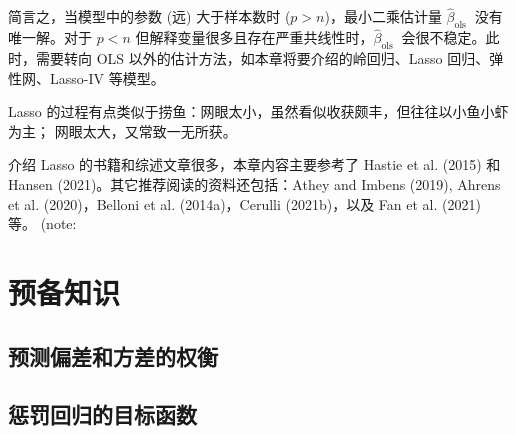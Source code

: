 简言之，当模型中的参数 (远) 大于样本数时 ($p>n$)，最小二乘估计量 $\widehat{\beta}_{\text {ols }}$ 没有唯一解。对于 $p<n$ 但解释变量很多且存在严重共线性时，$\widehat{\beta}_{\text {ols }}$ 会很不稳定。此时，需要转向 OLS 以外的估计方法，如本章将要介绍的岭回归、Lasso 回归、弹性网、Lasso-IV 等模型。 

Lasso 的过程有点类似于捞鱼：网眼太小，虽然看似收获颇丰，但往往以小鱼小虾为主；%
网眼太大，又常致一无所获。%




介绍 Lasso 的书籍和综述文章很多，本章内容主要参考了 Hastie et al. (2015) 和 Hansen (2021)。其它推荐阅读的资料还包括：Athey and Imbens (2019), Ahrens et al. (2020)，Belloni et al. (2014a)，Cerulli (2021b)，以及 Fan et al. (2021) 等。 (note: %


\section{预备知识}

\subsection{预测偏差和方差的权衡}

%


\subsection{惩罚回归的目标函数}\label{sec:Lasso-goal-function}

